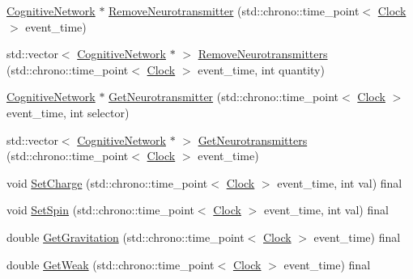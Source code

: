 \begin{DoxyCompactItemize}
\item 
\mbox{\hyperlink{classCognitiveNetwork}{Cognitive\+Network}} $\ast$ \mbox{\hyperlink{classCognitiveNetwork_ac0728c12a6d4bb87b6e8c9163435c8e6}{Remove\+Neurotransmitter}} (std\+::chrono\+::time\+\_\+point$<$ \mbox{\hyperlink{universe_8h_a0ef8d951d1ca5ab3cfaf7ab4c7a6fd80}{Clock}} $>$ event\+\_\+time)
\item 
std\+::vector$<$ \mbox{\hyperlink{classCognitiveNetwork}{Cognitive\+Network}} $\ast$ $>$ \mbox{\hyperlink{classCognitiveNetwork_a5e706084296ce84ff6884c1506213b03}{Remove\+Neurotransmitters}} (std\+::chrono\+::time\+\_\+point$<$ \mbox{\hyperlink{universe_8h_a0ef8d951d1ca5ab3cfaf7ab4c7a6fd80}{Clock}} $>$ event\+\_\+time, int quantity)
\item 
\mbox{\hyperlink{classCognitiveNetwork}{Cognitive\+Network}} $\ast$ \mbox{\hyperlink{classCognitiveNetwork_a85890c201376061b1ffbe8fdfc1a8633}{Get\+Neurotransmitter}} (std\+::chrono\+::time\+\_\+point$<$ \mbox{\hyperlink{universe_8h_a0ef8d951d1ca5ab3cfaf7ab4c7a6fd80}{Clock}} $>$ event\+\_\+time, int selector)
\item 
std\+::vector$<$ \mbox{\hyperlink{classCognitiveNetwork}{Cognitive\+Network}} $\ast$ $>$ \mbox{\hyperlink{classCognitiveNetwork_ac56b1585864b372c8897dcb5720d00a7}{Get\+Neurotransmitters}} (std\+::chrono\+::time\+\_\+point$<$ \mbox{\hyperlink{universe_8h_a0ef8d951d1ca5ab3cfaf7ab4c7a6fd80}{Clock}} $>$ event\+\_\+time)
\item 
void \mbox{\hyperlink{classCognitiveNetwork_a99f801aeca299186cc706696696749b1}{Set\+Charge}} (std\+::chrono\+::time\+\_\+point$<$ \mbox{\hyperlink{universe_8h_a0ef8d951d1ca5ab3cfaf7ab4c7a6fd80}{Clock}} $>$ event\+\_\+time, int val) final
\item 
void \mbox{\hyperlink{classCognitiveNetwork_a3fc6d08413bfd4350f94d6f2627eedc7}{Set\+Spin}} (std\+::chrono\+::time\+\_\+point$<$ \mbox{\hyperlink{universe_8h_a0ef8d951d1ca5ab3cfaf7ab4c7a6fd80}{Clock}} $>$ event\+\_\+time, int val) final
\item 
double \mbox{\hyperlink{classCognitiveNetwork_a4b5150310288c52f00ecb745ae9e7f86}{Get\+Gravitation}} (std\+::chrono\+::time\+\_\+point$<$ \mbox{\hyperlink{universe_8h_a0ef8d951d1ca5ab3cfaf7ab4c7a6fd80}{Clock}} $>$ event\+\_\+time) final
\item 
double \mbox{\hyperlink{classCognitiveNetwork_a761db75ac8eab7b4625e5a398891bd12}{Get\+Weak}} (std\+::chrono\+::time\+\_\+point$<$ \mbox{\hyperlink{universe_8h_a0ef8d951d1ca5ab3cfaf7ab4c7a6fd80}{Clock}} $>$ event\+\_\+time) final
\item 

\end{DoxyCompactItemize}
